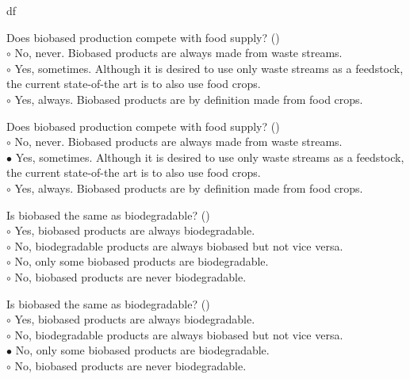 df\documentclass[]{beamer}
\begin{document}
\begin{CJK}{UTF8}{gbsn}
\begin{frame}[shrink] {}
\addtocounter{questions}{1}
\color{blue}
Does biobased production compete with food supply?
({})\\
\color{black}
\setlength{\parindent}{-0.4cm}
{\color{red}$\circ$} No, never. Biobased products are always made from waste streams.  \\
{\color{red}$\circ$}  Yes, sometimes. Although it is desired to use only waste streams as a feedstock, the current state-of-the art is to also use food crops.  \\
{\color{red}$\circ$} Yes, always. Biobased products are by definition made from food crops.  \\
\end{frame}
\begin{frame}[shrink] {}
\addtocounter{answers}{1}
\color{blue}
Does biobased production compete with food supply?
({})\\
\color{black}
\setlength{\parindent}{-0.4cm}
{\color{red}$\circ$} No, never. Biobased products are always made from waste streams.  \\
{\color{red}$\bullet$} Yes, sometimes. Although it is desired to use only waste streams as a feedstock, the current state-of-the art is to also use food crops.  \\
{\color{red}$\circ$} Yes, always. Biobased products are by definition made from food crops.  \\
\end{frame}


\begin{frame}[shrink] {}
\addtocounter{questions}{1}
\color{blue}
Is biobased the same as biodegradable?
({})\\
\color{black}
\setlength{\parindent}{-0.4cm}
{\color{red}$\circ$} Yes, biobased products are always biodegradable.  \\
{\color{red}$\circ$} No, biodegradable products are always biobased but not vice versa.  \\
{\color{red}$\circ$}  No, only some biobased products are biodegradable.  \\
{\color{red}$\circ$} No, biobased products are never biodegradable.  \\
\end{frame}
\begin{frame}[shrink] {}
\addtocounter{answers}{1}
\color{blue}
Is biobased the same as biodegradable?
({})\\
\color{black}
\setlength{\parindent}{-0.4cm}
{\color{red}$\circ$} Yes, biobased products are always biodegradable.  \\
{\color{red}$\circ$} No, biodegradable products are always biobased but not vice versa.  \\
{\color{red}$\bullet$} No, only some biobased products are biodegradable.  \\
{\color{red}$\circ$} No, biobased products are never biodegradable.  \\
\end{frame}



\end{CJK}
\end{document}
